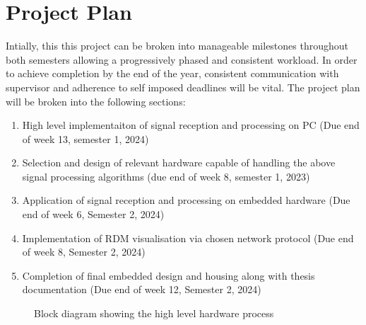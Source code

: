 \documentclass[12pt,a4paper]{article}
\begin{document}
\section{Project Plan}
Intially, this this project can be broken into manageable milestones throughout both semesters allowing a progressively phased and consistent workload. In order to achieve completion by the end of the year, consistent communication with supervisor and adherence to self imposed deadlines will be vital. The project plan will be broken into the following sections:
\begin{enumerate}[label=\arabic*.]
    \item High level implementaiton of signal reception and processing on PC (Due end of week 13, semester 1, 2024)
    \item Selection and design of relevant hardware capable of handling the above signal processing algorithms (due end of week 8, semester 1, 2023)
    \item Application of signal reception and processing on embedded hardware (Due end of week 6, Semester 2, 2024)
    \item Implementation of RDM visualisation via chosen network protocol (Due end of week 8, Semester 2, 2024)
    \item Completion of final embedded design and housing along with thesis documentation (Due end of week 12, Semester 2, 2024)
\end{enumerate}


\begin{figure}[htbp]
    \centering
    \caption{Block diagram showing the high level hardware process}
    \label{fig:signal_processing_flow}
\end{figure}
\end{document}

